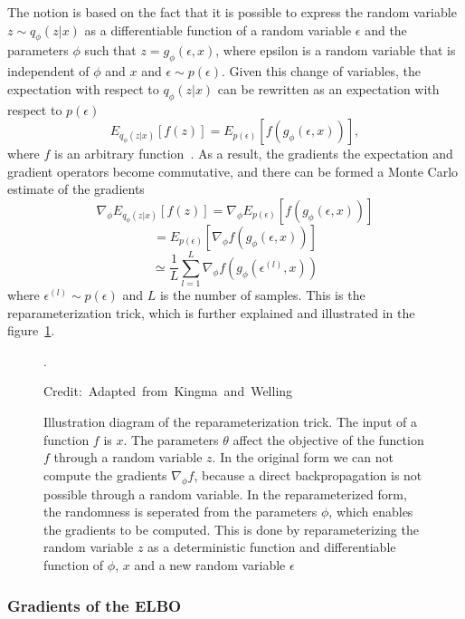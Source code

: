 The notion is based on the fact that it is possible to express the random variable $z \sim q_{\phi}(z|x)$ as a differentiable function of a random variable $\epsilon$ and the parameters $\phi$ such that $z = g_{\phi}(\epsilon, x)$, where epsilon is a random variable that is independent of $\phi$ and $x$ and $\epsilon \sim p(\epsilon)$. Given this change of variables, the expectation with respect to $q_{\phi}(z|x)$ can be rewritten as an expectation with respect to $p(\epsilon)$
\[ E_{q_{\phi}(z|x)}[f(z)] = E_{p(\epsilon)}[f(g_{\phi}(\epsilon, x))], \]
where $f$ is an arbitrary function~\cite{Kingma_2019}.
As a result, the gradients the expectation and gradient operators become commutative, and there can be formed a Monte Carlo estimate of the gradients
\[ \nabla_{\phi} E_{q_{\phi}(z|x)}[f(z)] = \nabla_{\phi} E_{p(\epsilon)}[ f(g_{\phi}(\epsilon, x))] \]
\[ = E_{p(\epsilon)}[\nabla_{\phi} f(g_{\phi}(\epsilon, x))] \]
\[  \simeq \frac{1}{L} \sum_{l=1}^{L} \nabla_{\phi} f(g_{\phi}(\epsilon^{(l)}, x)) \]
where $\epsilon^{(l)} \sim p(\epsilon)$ and $L$ is the number of samples.
This is the reparameterization trick, which is further explained and illustrated in the figure~\ref{reparametrization}.

\begin{figure}
    \centering
    
    \caption[Illustration diagram of the reparameterization trick]%
    {Illustration diagram of the reparameterization trick. The input of a function $f$ is $x$. The parameters $\theta$ affect the objective of the function $f$ through a random variable $z$. In the original form we can not compute the gradients $\nabla_{\phi} f$, because a direct backpropagation is not possible through a random variable. In the reparameterized form, the randomness is seperated from the parameters $\phi$, which enables the gradients to be computed. This is done by reparameterizing the random variable $z$ as a deterministic function and differentiable function  of $\phi$, $x$ and a new random variable $\epsilon$~\cite{Kingma_2019}}.

    \hspace*{15pt}\hbox{\scriptsize Credit: Adapted from Kingma and Welling\cite{Kingma_2019}  }\label{reparametrization}

\end{figure}

\subsubsection{Gradients of the ELBO}

